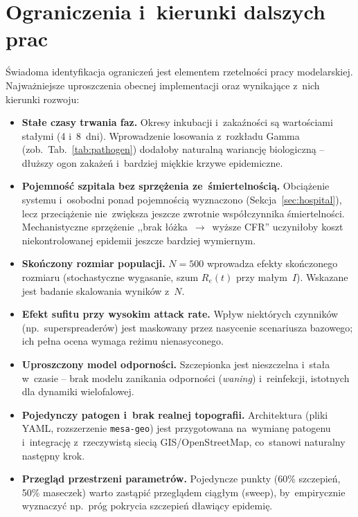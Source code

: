 \documentclass[polish]{projectreport}
\begin{document}
\section{Ograniczenia i~kierunki dalszych prac}
\label{sec:limitations}

Świadoma identyfikacja ograniczeń jest elementem rzetelności pracy
modelarskiej. Najważniejsze uproszczenia obecnej implementacji oraz
wynikające z~nich kierunki rozwoju:

\begin{itemize}
  \item \textbf{Stałe czasy trwania faz.} Okresy inkubacji i~zakaźności
        są wartościami stałymi (4 i~8~dni). Wprowadzenie losowania
        z~rozkładu Gamma (zob.\ Tab.~\ref{tab:pathogen}) dodałoby naturalną
        wariancję biologiczną -- dłuższy ogon zakażeń i~bardziej miękkie
        krzywe epidemiczne.
  \item \textbf{Pojemność szpitala bez sprzężenia ze~śmiertelnością.}
        Obciążenie systemu i~osobodni ponad pojemnością wyznaczono
        (Sekcja~\ref{sec:hospital}), lecz przeciążenie nie~zwiększa jeszcze
        zwrotnie współczynnika śmiertelności. Mechanistyczne sprzężenie
        ,,brak łóżka~$\to$~wyższe CFR'' uczyniłoby koszt niekontrolowanej
        epidemii jeszcze bardziej wymiernym.
  \item \textbf{Skończony rozmiar populacji.} $N = 500$ wprowadza efekty
        skończonego rozmiaru (stochastyczne wygasanie, szum $R_e(t)$ przy
        małym~$I$). Wskazane jest badanie skalowania wyników z~$N$.
  \item \textbf{Efekt sufitu przy wysokim attack rate.} Wpływ niektórych
        czynników (np.\ superspreaderów) jest maskowany przez nasycenie
        scenariusza bazowego; ich pełna ocena wymaga reżimu nienasyconego.
  \item \textbf{Uproszczony model odporności.} Szczepionka jest nieszczelna
        i~stała w~czasie -- brak modelu zanikania odporności (\textit{waning})
        i~reinfekcji, istotnych dla dynamiki wielofalowej.
  \item \textbf{Pojedynczy patogen i~brak realnej topografii.} Architektura
        (pliki YAML, rozszerzenie \texttt{mesa-geo}) jest przygotowana
        na~wymianę patogenu i~integrację z~rzeczywistą siecią GIS/OpenStreetMap,
        co~stanowi naturalny następny krok.
  \item \textbf{Przegląd przestrzeni parametrów.} Pojedyncze punkty (60\%
        szczepień, 50\% maseczek) warto zastąpić przeglądem ciągłym (sweep),
        by~empirycznie wyznaczyć np.\ próg pokrycia szczepień dławiący epidemię.
\end{itemize}
\end{document}
